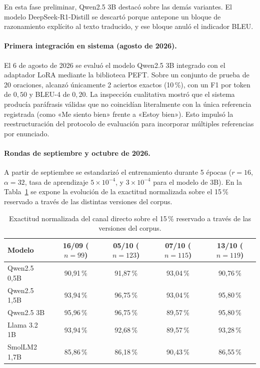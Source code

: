 En esta fase preliminar, Qwen2.5 3B destacó sobre las demás variantes. El modelo DeepSeek-R1-Distill se descartó porque antepone un bloque de razonamiento explícito al texto traducido, y ese bloque anuló el indicador BLEU.

\paragraph{Primera integración en sistema (agosto de 2026).}
El 6 de agosto de 2026 se evaluó el modelo Qwen2.5 3B integrado con el adaptador LoRA mediante la biblioteca PEFT. Sobre un conjunto de prueba de 20 oraciones, alcanzó únicamente 2 aciertos exactos (10\,\%), con un F1 por token de $0{,}50$ y BLEU-4 de $0{,}20$. La inspección cualitativa mostró que el sistema producía paráfrasis válidas que no coincidían literalmente con la única referencia registrada (como «Me siento bien» frente a «Estoy bien»). Esto impulsó la reestructuración del protocolo de evaluación para incorporar múltiples referencias por enunciado.

\paragraph{Rondas de septiembre y octubre de 2026.}
A partir de septiembre se estandarizó el entrenamiento durante 5 épocas ($r=16$, $\alpha=32$, tasa de aprendizaje $5 \times 10^{-4}$, y $3 \times 10^{-4}$ para el modelo de 3B). En la Tabla~\ref{tab:slm_evolucion} se expone la evolución de la exactitud normalizada sobre el 15\,\% reservado a través de las distintas versiones del corpus.

\begin{table}[H]
    \centering
    \small
    \caption{Exactitud normalizada del canal directo sobre el 15\,\% reservado a través de las versiones del corpus.}
    \label{tab:slm_evolucion}
    \begin{tabular}{lcccc}
        \toprule
        \textbf{Modelo} & \textbf{16/09 ($n=99$)} & \textbf{05/10 ($n=123$)} & \textbf{07/10 ($n=115$)} & \textbf{13/10 ($n=119$)} \\
        \midrule
        Qwen2.5 0,5B & 90{,}91\,\% & 91{,}87\,\% & 93{,}04\,\% & 90{,}76\,\% \\
        Qwen2.5 1,5B & 93{,}94\,\% & 96{,}75\,\% & 93{,}04\,\% & 95{,}80\,\% \\
        Qwen2.5 3B & 95{,}96\,\% & 96{,}75\,\% & 89{,}57\,\% & 95{,}80\,\% \\
        Llama 3.2 1B & 93{,}94\,\% & 92{,}68\,\% & 89{,}57\,\% & 93{,}28\,\% \\
        SmolLM2 1,7B & 85{,}86\,\% & 86{,}18\,\% & 90{,}43\,\% & 86{,}55\,\% \\
        \bottomrule
    \end{tabular}
\end{table}

